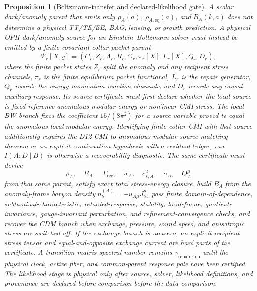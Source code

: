 \documentclass[11pt]{article}
\newtheorem{proposition}[theorem]{Proposition}
\begin{document}
\begin{proposition}[Boltzmann-transfer and declared-likelihood gate]\label{prop:compact-boltzmann-frozen-gate}
A scalar dark/anomaly parent that emits only
\(\rho_A(a)\), \(\rho_{A,\mathrm{eq}}(a)\), and \(B_A(k,a)\) does not determine a
physical TT/TE/EE, BAO, lensing, or growth prediction. A physical OPH
dark/anomaly source for an Einstein--Boltzmann solver must instead be emitted by
a finite covariant collar-packet parent
\[
\mathcal P_r[X,g]=(C_r,Z_r,A_r,R_r,G_r,\pi_r[X],L_r[X],Q_r,D_r),
\]
where the finite packet states \(Z_r\) split the anomaly and any recipient
stress channels, \(\pi_r\) is the finite equilibrium packet functional, \(L_r\)
is the repair generator, \(Q_r\) records the energy-momentum reaction channels,
and \(D_r\) records any causal auxiliary response. Its source certificate must
first declare whether the local source is fixed-reference anomalous modular
energy or nonlinear CMI stress. The local BW branch fixes the coefficient
\(15/(8\pi^2)\) for a source variable proved to equal the anomalous local
modular energy. Identifying finite collar CMI with that source additionally
requires the D12 CMI-to-anomalous-modular-source matching theorem or an
explicit continuation hypothesis with a residual ledger; raw
\(I(A:D\mid B)\) is otherwise a recoverability diagnostic. The same certificate
must
derive
\[
\rho_A,\quad B_A,\quad \Gamma_{\mathrm{rec}},\quad
w_A,\quad c_{s,A}^2,\quad \sigma_A,\quad Q_A^\mu
\]
from that same parent, satisfy exact total stress-energy closure, build \(B_A\)
from the anomaly-frame baryon density \(n_b^{(A)}=-u_{A\mu}J_b^\mu\), pass
finite domain-of-dependence, subluminal-characteristic, retarded-response,
stability, local-frame, quotient-invariance, gauge-invariant perturbation, and
refinement-convergence checks, and recover the CDM branch when exchange,
pressure, sound speed, and anisotropic stress are switched off. If the exchange
branch is nonzero, an explicit recipient stress tensor and equal-and-opposite
exchange current are hard parts of the certificate. A transition-matrix spectral number remains
\(\gamma_{\mathrm{repair\ step}}\) until the physical clock, active fiber, and
common-parent response pole have been certified. The likelihood stage is
physical only after source, solver, likelihood definitions, and provenance are declared before comparison
before the data comparison.
\end{proposition}
\end{document}
